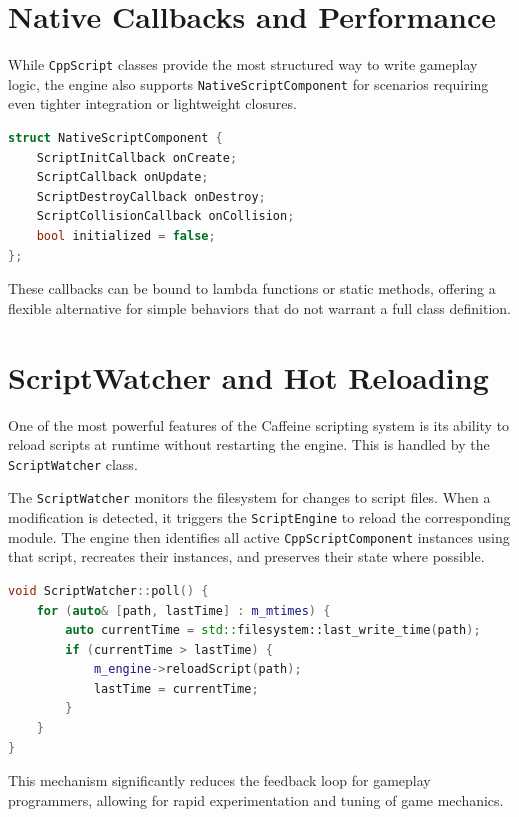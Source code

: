 \section{Native Callbacks and Performance}

While \texttt{CppScript} classes provide the most structured way to write gameplay logic, the engine also supports \texttt{NativeScriptComponent} for scenarios requiring even tighter integration or lightweight closures.

\begin{lstlisting}[language=C++, caption=NativeScriptComponent Structure]
struct NativeScriptComponent {
    ScriptInitCallback onCreate;
    ScriptCallback onUpdate;
    ScriptDestroyCallback onDestroy;
    ScriptCollisionCallback onCollision;
    bool initialized = false;
};
\end{lstlisting}

These callbacks can be bound to lambda functions or static methods, offering a flexible alternative for simple behaviors that do not warrant a full class definition.

\section{ScriptWatcher and Hot Reloading}

One of the most powerful features of the Caffeine scripting system is its ability to reload scripts at runtime without restarting the engine. This is handled by the \texttt{ScriptWatcher} class.

The \texttt{ScriptWatcher} monitors the filesystem for changes to script files. When a modification is detected, it triggers the \texttt{ScriptEngine} to reload the corresponding module. The engine then identifies all active \texttt{CppScriptComponent} instances using that script, recreates their instances, and preserves their state where possible.

\begin{lstlisting}[language=C++, caption=ScriptWatcher Polling]
void ScriptWatcher::poll() {
    for (auto& [path, lastTime] : m_mtimes) {
        auto currentTime = std::filesystem::last_write_time(path);
        if (currentTime > lastTime) {
            m_engine->reloadScript(path);
            lastTime = currentTime;
        }
    }
}
\end{lstlisting}

This mechanism significantly reduces the feedback loop for gameplay programmers, allowing for rapid experimentation and tuning of game mechanics.
